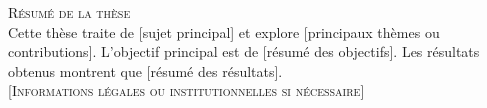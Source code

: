 \begin{titlepage}
    \vspace*{\fill}
    \begin{center}
        {\large \textsc{Résumé de la thèse}} \\[1cm]
        \noindent Cette thèse traite de [sujet principal] et explore [principaux thèmes ou contributions]. L'objectif principal est de [résumé des objectifs]. Les résultats obtenus montrent que [résumé des résultats].\\[2cm]


        \textsc{\small [Informations légales ou institutionnelles si nécessaire]}\\
    \end{center}
    \vspace*{\fill}
\end{titlepage}
